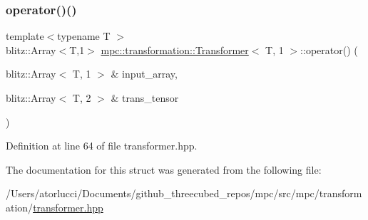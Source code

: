 \subsubsection{\texorpdfstring{operator()()}{operator()()}}
{\footnotesize\ttfamily template$<$typename T $>$ \\
blitz\+::\+Array$<$T,1$>$ \mbox{\hyperlink{structmpc_1_1transformation_1_1_transformer}{mpc\+::transformation\+::\+Transformer}}$<$ T, 1 $>$\+::operator() (\begin{DoxyParamCaption}\item[{blitz\+::\+Array$<$ T, 1 $>$ \&}]{input\+\_\+array,  }\item[{blitz\+::\+Array$<$ T, 2 $>$ \&}]{trans\+\_\+tensor }\end{DoxyParamCaption})\hspace{0.3cm}{\ttfamily [inline]}}



Definition at line 64 of file transformer.\+hpp.



The documentation for this struct was generated from the following file\+:\begin{DoxyCompactItemize}
\item 
/\+Users/atorlucci/\+Documents/github\+\_\+threecubed\+\_\+repos/mpc/src/mpc/transformation/\mbox{\hyperlink{transformer_8hpp}{transformer.\+hpp}}\end{DoxyCompactItemize}
